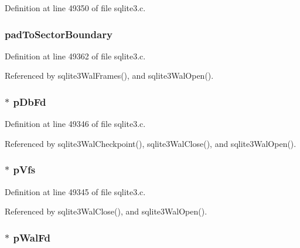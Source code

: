 Definition at line 49350 of file sqlite3.\+c.

\hypertarget{struct_wal_a844f9eb46098c2a96dd9118be0060d64}{}
\subsubsection[{pad\+To\+Sector\+Boundary}]{ pad\+To\+Sector\+Boundary}\label{struct_wal_a844f9eb46098c2a96dd9118be0060d64}


Definition at line 49362 of file sqlite3.\+c.



Referenced by sqlite3\+Wal\+Frames(), and sqlite3\+Wal\+Open().

\hypertarget{struct_wal_a563d948db79b528e98ecde97be738efd}{}
\subsubsection[{p\+Db\+Fd}]{$\ast$ p\+Db\+Fd}\label{struct_wal_a563d948db79b528e98ecde97be738efd}


Definition at line 49346 of file sqlite3.\+c.



Referenced by sqlite3\+Wal\+Checkpoint(), sqlite3\+Wal\+Close(), and sqlite3\+Wal\+Open().

\hypertarget{struct_wal_a59603ca1cedf2bda0ee4e65eb610a0b5}{}
\subsubsection[{p\+Vfs}]{$\ast$ p\+Vfs}\label{struct_wal_a59603ca1cedf2bda0ee4e65eb610a0b5}


Definition at line 49345 of file sqlite3.\+c.



Referenced by sqlite3\+Wal\+Close(), and sqlite3\+Wal\+Open().

\hypertarget{struct_wal_ad8a716292b0beff8f69c9917de90b9c0}{}
\subsubsection[{p\+Wal\+Fd}]{$\ast$ p\+Wal\+Fd}\label{struct_wal_ad8a716292b0beff8f69c9917de90b9c0}


